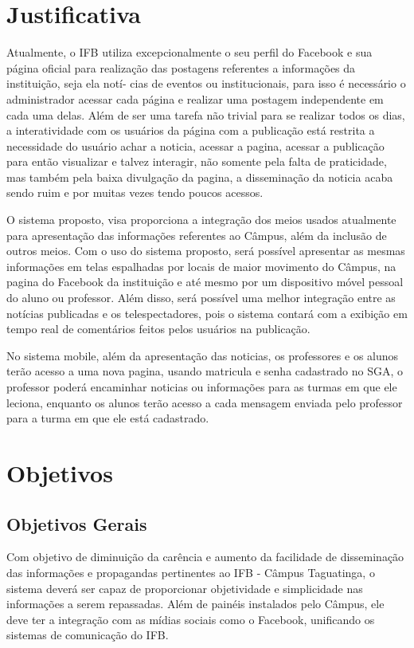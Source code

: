 \section{Justificativa}
Atualmente, o IFB utiliza excepcionalmente o seu perfil do Facebook e sua página
oficial para realização das postagens referentes a informações da instituição, seja ela notí-
cias de eventos ou institucionais, para isso é necessário o administrador acessar cada página
e realizar uma postagem independente em cada uma delas. Além de ser uma tarefa não
trivial para se realizar todos os dias, a interatividade com os usuários da página com a
publicação está restrita a necessidade do usuário achar a noticia, acessar a pagina, acessar
a publicação para então visualizar e talvez interagir, não somente pela falta de praticidade,
mas também pela baixa divulgação da pagina, a disseminação da noticia acaba
sendo ruim e por muitas vezes tendo poucos acessos.

O sistema proposto, visa proporciona a integração dos meios usados atualmente
para apresentação das informações referentes ao Câmpus, além da inclusão de outros
meios. Com o uso do sistema proposto, será possível apresentar as mesmas informações
em telas espalhadas por locais de maior movimento do Câmpus, na pagina do Facebook
da instituição e até mesmo por um dispositivo móvel pessoal do aluno ou professor. Além
disso, será possível uma melhor integração entre as notícias publicadas e os telespectadores,
pois o sistema contará com a exibição em tempo real de comentários feitos pelos
usuários na publicação.

No sistema mobile, além da apresentação das noticias, os professores e os alunos
terão acesso a uma nova pagina, usando matricula e senha cadastrado no SGA, o professor
poderá encaminhar noticias ou informações para as turmas em que ele leciona, enquanto
os alunos terão acesso a cada mensagem enviada pelo professor para a turma em que ele
está cadastrado.

\section{Objetivos}
\subsection{Objetivos Gerais}
Com objetivo de diminuição da carência e aumento da facilidade de disseminação
das informações e propagandas pertinentes ao IFB - Câmpus Taguatinga, o sistema deverá
ser capaz de proporcionar objetividade e simplicidade nas informações a serem repassadas.
Além de painéis instalados pelo Câmpus, ele deve ter a integração com as mídias sociais
como o Facebook, unificando os sistemas de comunicação do IFB.

